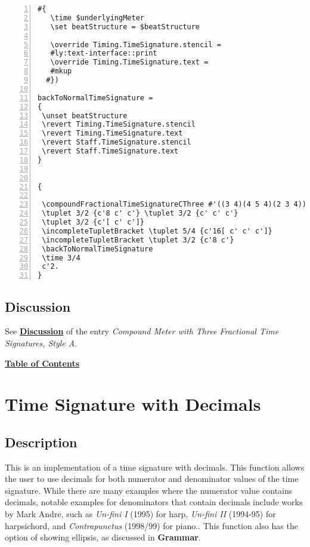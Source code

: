 \begin{Verbatim}[numbers=left,xleftmargin=5mm]
  #{
   \time $underlyingMeter
   \set beatStructure = $beatStructure

   \override Timing.TimeSignature.stencil =
   #ly:text-interface::print
   \override Timing.TimeSignature.text =
   #mkup
  #})

backToNormalTimeSignature =
{
 \unset beatStructure
 \revert Timing.TimeSignature.stencil
 \revert Timing.TimeSignature.text
 \revert Staff.TimeSignature.stencil
 \revert Staff.TimeSignature.text
}


{

 \compoundFractionalTimeSignatureCThree #'((3 4)(4 5 4)(2 3 4)) 67/60 3,3,3,4,2
 \tuplet 3/2 {c'8 c' c'} \tuplet 3/2 {c' c' c'}
 \tuplet 3/2 {c'[ c' c']}
 \incompleteTupletBracket \tuplet 5/4 {c'16[ c' c' c']}
 \incompleteTupletBracket \tuplet 3/2 {c'8 c'}
 \backToNormalTimeSignature
 \time 3/4
 c'2.
}

\end{Verbatim}


\subsection{Discussion}
See \hyperref[sec:compoundfractionalmeter_discussion_two]{\textbf{Discussion}} of the entry \textit{Compound Meter with Three Fractional Time Signatures, Style A.}


\hyperref[sec:toc]{\textbf{Table of Contents}}

\vfill \break





\section {Time Signature with Decimals}

\hfill
{}
\hfill

\subsection{Description}
This is an implementation of a time signature with decimals. This function allows the user to use decimals for both numerator and denominator values of the time signature. While there are many examples where the numerator value contains decimals, notable examples for denominators that contain decimals include works by Mark Andre, such as \textit{Un-fini I} (1995) for harp,\autocite{RN1755} \textit{Un-fini II} (1994-95) for harpsichord,\autocite{RN1754} and \textit{Contrapunctus} (1998/99) for piano.\autocite{RN1753}. This function also has the option of showing ellipsis, as discussed in \textbf{Grammar}. 
